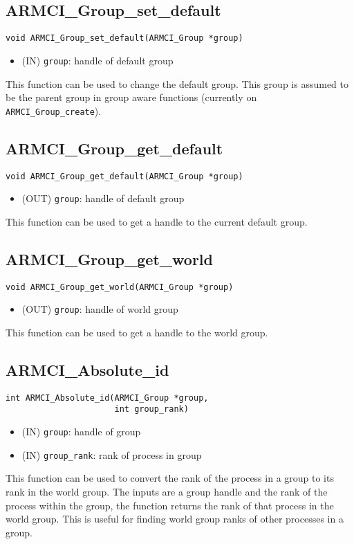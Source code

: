 \documentclass[12pt]{article}
\begin{document}
\subsection{ARMCI\_Group\_set\_default}
\begin{verbatim}
void ARMCI_Group_set_default(ARMCI_Group *group)
\end{verbatim}
\begin{itemize}
\item (IN) \texttt{group}: handle of default group
\end{itemize}
This function can be used to change the default group. This group is assumed to
be the parent group in group aware functions (currently on
\texttt{ARMCI\_Group\_create}).

\subsection{ARMCI\_Group\_get\_default}
\begin{verbatim}
void ARMCI_Group_get_default(ARMCI_Group *group)
\end{verbatim}
\begin{itemize}
\item (OUT) \texttt{group}: handle of default group
\end{itemize}
This function can be used to get a handle to the current default group.

\subsection{ARMCI\_Group\_get\_world}
\begin{verbatim}
void ARMCI_Group_get_world(ARMCI_Group *group)
\end{verbatim}
\begin{itemize}
\item (OUT) \texttt{group}: handle of world group
\end{itemize}
This function can be used to get a handle to the world group.

\subsection{ARMCI\_Absolute\_id}
\begin{verbatim}
int ARMCI_Absolute_id(ARMCI_Group *group,
                      int group_rank)
\end{verbatim}
\begin{itemize}
\item (IN) \texttt{group}: handle of group
\item (IN) \texttt{group\_rank}: rank of process in group
\end{itemize}
This function can be used to convert the rank of the process in a group to its
rank in the world group. The inputs are a group handle and the rank of the
process within the group, the function returns the rank of that process in the
world group. This is useful for finding world group ranks of other processes in
a group.
\end{document}
